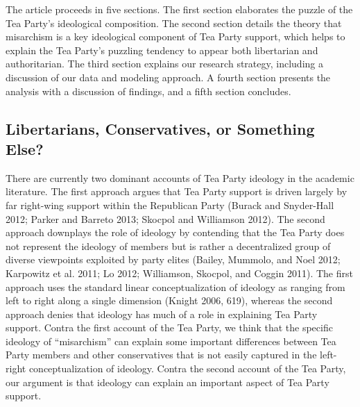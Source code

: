 \documentclass[12pt,]{article}
\begin{document}
The article proceeds in five sections. The first section elaborates the
puzzle of the Tea Party's ideological composition. The second section
details the theory that misarchism is a key ideological component of Tea Party support, which helps to explain the Tea Party's puzzling tendency to appear both libertarian and authoritarian. The
third section explains our research strategy, including a discussion of
our data and modeling approach. A fourth section presents the analysis
with a discussion of findings, and a fifth section concludes.

\subsection{Libertarians, Conservatives, or Something
Else?}\label{the-tea-party-libertarians-social-conservatives-both-or-something-else}

There are currently two dominant accounts of Tea Party ideology in the
academic literature. The first approach argues that Tea Party support is
driven largely by far right-wing support within the Republican Party
(Burack and Snyder-Hall 2012; Parker and Barreto 2013; Skocpol and
Williamson 2012). The second approach downplays the role of ideology by
contending that the Tea Party does not represent the ideology of members
but is rather a decentralized group of diverse viewpoints exploited by
party elites (Bailey, Mummolo, and Noel 2012; Karpowitz et al. 2011; Lo
2012; Williamson, Skocpol, and Coggin 2011). The first approach uses the
standard linear conceptualization of ideology as ranging from left to
right along a single dimension (Knight 2006, 619), whereas the second
approach denies that ideology has much of a role in explaining Tea Party
support. Contra the first account of the Tea Party, we think that the
specific ideology of ``misarchism'' can explain some important
differences between Tea Party members and other conservatives that is
not easily captured in the left-right conceptualization of ideology.
Contra the second account of the Tea Party, our argument is that
ideology can explain an important aspect of Tea Party support.
\end{document}
